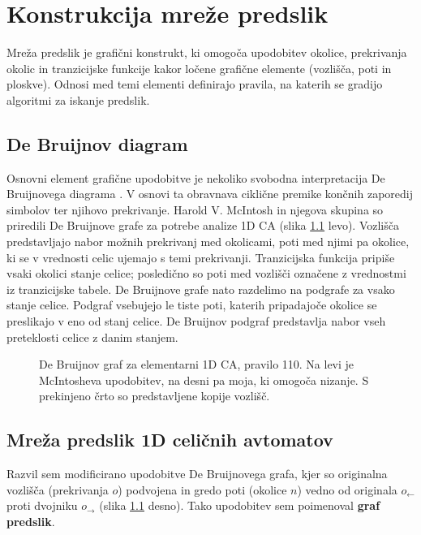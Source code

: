 \documentclass[12pt,a4paper,openany,twoside]{book}
\begin{document}
\chapter{Konstrukcija mreže predslik}
\label{mreža}

Mreža predslik je grafični konstrukt, ki omogoča upodobitev
okolice, prekrivanja okolic in tranzicijske funkcije
kakor ločene grafične elemente (vozlišča, poti in ploskve).
Odnosi med temi elementi definirajo pravila,
na katerih se gradijo algoritmi za iskanje predslik.

\section{De Bruijnov diagram}

Osnovni element grafične upodobitve je nekoliko svobodna interpretacija De Bruijnovega diagrama \cite{WikiDeBruijn}.
V osnovi ta obravnava ciklične premike končnih zaporedij simbolov ter njihovo prekrivanje.
Harold V. McIntosh \cite{McIntosh1991} in njegova skupina \cite{Soto2008}
so priredili De Bruijnove grafe za potrebe analize 1D CA (slika \ref{de_bruijn_diagram} levo).
Vozlišča predstavljajo nabor možnih prekrivanj med okolicami,
poti med njimi pa okolice, ki se v vrednosti celic ujemajo s temi prekrivanji.
Tranzicijska funkcija pripiše vsaki okolici stanje celice;
posledično so poti med vozlišči označene z vrednostmi iz tranzicijske tabele.
De Bruijnove grafe nato razdelimo na podgrafe za vsako stanje celice.
Podgraf vsebujejo le tiste poti, katerih pripadajoče okolice se preslikajo v eno od stanj celice.
De Bruijnov podgraf predstavlja nabor vseh preteklosti celice z danim stanjem.

\begin{figure}[htb]
\centerline{}
\caption[De Bruijnov graf, pravilo 110.]
{De Bruijnov graf za elementarni 1D CA, pravilo 110.
Na levi je McIntosheva upodobitev, na desni pa moja, ki omogoča nizanje.
S prekinjeno črto so predstavljene kopije vozlišč.}
\label{de_bruijn_diagram}
\end{figure}

\section{Mreža predslik 1D celičnih avtomatov}

Razvil sem \cite{JerasDobnikar2007} modificirano upodobitve De Bruijnovega grafa,
kjer so originalna vozlišča (prekrivanja \(o\)) podvojena
in gredo poti (okolice \(n\)) vedno od originala \(o_{\leftarrow}\)
proti dvojniku \(o_{\rightarrow}\) (slika \ref{de_bruijn_diagram} desno).
Tako upodobitev sem poimenoval \textbf{graf predslik}.
\end{document}
